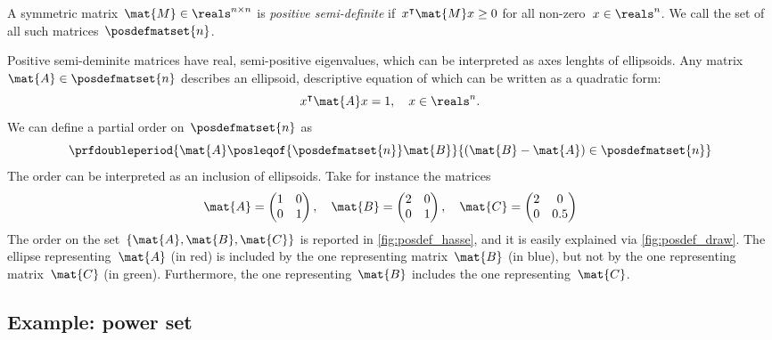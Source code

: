 \begin{example}
	\begin{definition}
		A symmetric matrix~$\mat{M}\in \reals^{n\times n}$ is \emph{positive semi-definite} if~$x^\intercal \mat{M}x\geq 0$ for all non-zero~$x\in \reals^n$.
		We call the set of all such matrices~$\posdefmatset{n}$.
	\end{definition}
	Positive semi-deminite matrices have real, semi-positive eigenvalues, which can be interpreted as axes lenghts of ellipsoids.
	Any matrix~$\mat{A}\in \posdefmatset{n}$ describes an ellipsoid, descriptive equation of which can be written as a quadratic form:
	\begin{equation*}
		x^\intercal \mat{A}x=1,\quad x\in \reals^n.
	\end{equation*}
	We can define a partial order on~$\posdefmatset{n}$ as
	\begin{equation*}
		\prfdoubleperiod{
			\mat{A}\posleqof{\posdefmatset{n}} \mat{B}
		}{
			(\mat{B}-\mat{A})\in \posdefmatset{n}
		}
	\end{equation*}
	The order can be interpreted as an inclusion of ellipsoids.
	Take for instance the matrices
	\begin{equation*}
		\mat{A}=
		\begin{pmatrix}
			1 & 0 \\0& 1
		\end{pmatrix}, \quad \mat{B}=
		\begin{pmatrix}
			2 & 0 \\0& 1
		\end{pmatrix},\quad \mat{C}=
		\begin{pmatrix}
			2 & 0 \\0& 0.5
		\end{pmatrix}
	\end{equation*}
	The order on the set~$\{\mat{A},\mat{B},\mat{C}\}$ is reported in \cref{fig:posdef_hasse}, and it is easily explained via \cref{fig:posdef_draw}.
	The ellipse representing~$\mat{A}$ (in red) is included by the one representing matrix~$\mat{B}$ (in blue), but not by the one representing matrix~$\mat{C}$ (in green).
	Furthermore, the one representing~$\mat{B}$ includes the one representing~$\mat{C}$.
\end{example}

\subsection{Example: power set}

